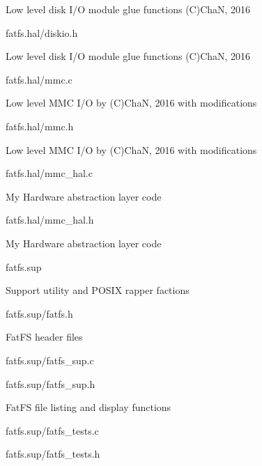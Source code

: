 {\begin{DoxyItemize}
\begin{DoxyItemize}
\begin{DoxyItemize}
\item Low level disk I/O module glue functions (C)ChaN, 2016
\end{DoxyItemize}
\item fatfs.\+hal/diskio.h
\begin{DoxyItemize}
\item Low level disk I/O module glue functions (C)ChaN, 2016
\end{DoxyItemize}
\item fatfs.\+hal/mmc.c
\begin{DoxyItemize}
\item Low level M\+MC I/O by (C)ChaN, 2016 with modifications
\end{DoxyItemize}
\item fatfs.\+hal/mmc.h
\begin{DoxyItemize}
\item Low level M\+MC I/O by (C)ChaN, 2016 with modifications
\end{DoxyItemize}
\item fatfs.\+hal/mmc\+\_\+hal.c
\begin{DoxyItemize}
\item My Hardware abstraction layer code
\end{DoxyItemize}
\item fatfs.\+hal/mmc\+\_\+hal.h
\begin{DoxyItemize}
\item My Hardware abstraction layer code
\end{DoxyItemize}
\end{DoxyItemize}
\item fatfs.\+sup
\begin{DoxyItemize}
\item Support utility and P\+O\+S\+IX rapper factions
\item fatfs.\+sup/fatfs.h
\begin{DoxyItemize}
\item Fat\+FS header files
\end{DoxyItemize}
\item fatfs.\+sup/fatfs\+\_\+sup.c
\item fatfs.\+sup/fatfs\+\_\+sup.h
\begin{DoxyItemize}
\item Fat\+FS file listing and display functions
\end{DoxyItemize}
\item fatfs.\+sup/fatfs\+\_\+tests.c
\item fatfs.\+sup/fatfs\+\_\+tests.h

\end{DoxyItemize}
\end{DoxyItemize}}
